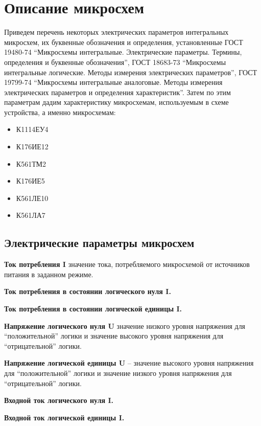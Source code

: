 \section{Описание микросхем}

Приведем перечень некоторых электрических параметров интегральных микросхем, их буквенные обозначения и определения, установленные ГОСТ 19480-74 “Микросхемы интегральные. Электрические параметры. Термины, определения и буквенные обозначения”, ГОСТ 18683-73 “Микросхемы интегральные логические. Методы измерения электрических параметров”, ГОСТ 19799-74 “Микросхемы интегральные аналоговые. Методы измерения электрических параметров и определения характеристик”. Затем по этим параметрам дадим характеристику микросхемам, используемым в схеме устройства, а именно микросхемам:

\begin{itemize}
	\item К1114ЕУ4
	\item К176ИЕ12
	\item К561ТМ2
	\item К176ИЕ5
	\item К561ЛЕ10
	\item К561ЛА7
\end{itemize}

\subsection*{Электрические параметры микросхем}

\textbf{Ток потребления I} \longndash значение тока, потребляемого микросхемой от источников питания в заданном режиме. 

\textbf{Ток потребления в состоянии логического нуля I.} 

\textbf{Ток потребления в состоянии логической единицы I.} 

\textbf{Напряжение логического нуля U} \longndash значение низкого уровня напряжения для “положительной” логики и значение высокого уровня напряжения для “отрицательной” логики. 

\textbf{Напряжение логической единицы U} – значение высокого уровня напряжения для “положительной” логики и значение низкого уровня напряжения для “отрицательной” логики. 

\textbf{Входной ток логического нуля I.}

\textbf{Входной ток логической единицы I.}

